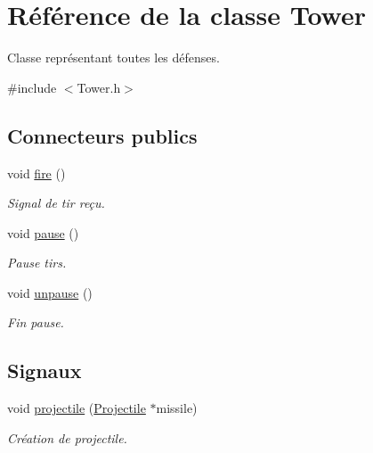 \hypertarget{classTower}{
\section{Référence de la classe Tower}
\label{classTower}
}


Classe représentant toutes les défenses.  




{\ttfamily \#include $<$Tower.h$>$}

\subsection*{Connecteurs publics}
\begin{DoxyCompactItemize}
\item 
void \hyperlink{classTower_aa0c9c780f48cffacd3da6877f5d4fdc2}{fire} ()
\begin{DoxyCompactList}\small\item\em Signal de tir reçu. \end{DoxyCompactList}\item 
void \hyperlink{classTower_ad6aa6d3d567855c721caab37fabfbd76}{pause} ()
\begin{DoxyCompactList}\small\item\em Pause tirs. \end{DoxyCompactList}\item 
void \hyperlink{classTower_aca92d523901d4307c681008156d0a293}{unpause} ()
\begin{DoxyCompactList}\small\item\em Fin pause. \end{DoxyCompactList}\end{DoxyCompactItemize}
\subsection*{Signaux}
\begin{DoxyCompactItemize}
\item 
void \hyperlink{classTower_aa303fa5bcabcf781c459d129b01ecfe8}{projectile} (\hyperlink{classProjectile}{Projectile} $\ast$missile)
\begin{DoxyCompactList}\small\item\em Création de projectile. \end{DoxyCompactList}\end{DoxyCompactItemize}
